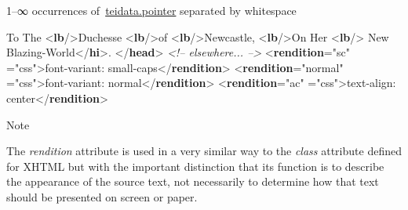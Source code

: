\begin{reflist}
\begin{sansreflist}
\begin{reflist}
  1–∞ occurrences of \hyperref[TEI.teidata.pointer]{teidata.pointer} separated by whitespace
    \item[]\mbox{}\newline 
{}To The {<\textbf{lb}/>}Duchesse {<\textbf{lb}/>}of {<\textbf{lb}/>}Newcastle, {<\textbf{lb}/>}On Her\mbox{}\newline 
{<\textbf{lb}/>}\mbox{}\newline 
{}New Blazing-World{</\textbf{hi}>}. \mbox{}\newline 
{</\textbf{head}>}\mbox{}\newline 
\textit{<!-- elsewhere... -->}\mbox{}\newline 
{<\textbf{rendition}\hspace*{1em}{xml:id}="{sc}"\mbox{}\newline 
\hspace*{1em}{scheme}="{css}">}font-variant: small-caps{</\textbf{rendition}>}\mbox{}\newline 
{<\textbf{rendition}\hspace*{1em}{xml:id}="{normal}"\mbox{}\newline 
\hspace*{1em}{scheme}="{css}">}font-variant: normal{</\textbf{rendition}>}\mbox{}\newline 
{<\textbf{rendition}\hspace*{1em}{xml:id}="{ac}"\mbox{}\newline 
\hspace*{1em}{scheme}="{css}">}text-align: center{</\textbf{rendition}>}
    \item[{Note}]
  \par
The {\itshape rendition} attribute is used in a very similar way to the {\itshape class} attribute defined for XHTML but with the important distinction that its function is to describe the appearance of the source text, not necessarily to determine how that text should be presented on screen or paper.\par

\end{reflist}
\end{sansreflist}
\end{reflist}
